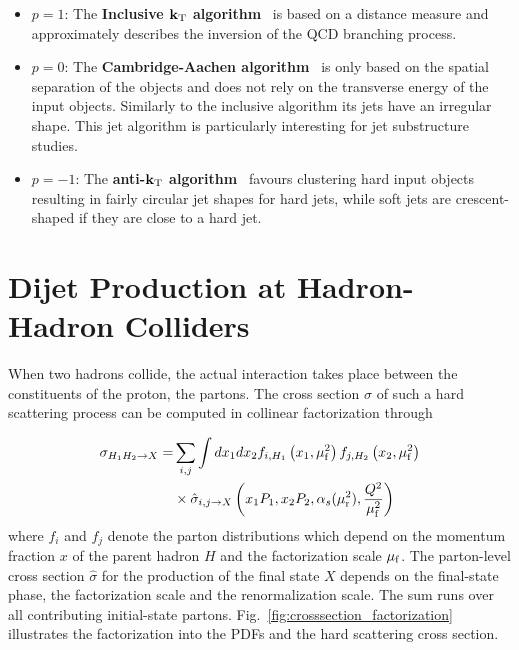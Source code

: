 \begin{itemize}
    \item $p=1$: The \textbf{Inclusive $\mathbf{k_{\mathrm{T}}}$
    algorithm}~\cite{Catani:1991hj,Catani:1992rm} is based on a \ptsq
        distance measure and approximately describes the inversion
        of the QCD branching process.
    \item $p=0$: The \textbf{Cambridge-Aachen
        algorithm}~\cite{Dokshitzer:1997in} is only based on the spatial
        separation of the objects and does not rely on the transverse energy of
        the input objects. Similarly to the inclusive \kt algorithm its jets
        have an irregular shape. This jet algorithm is particularly interesting
        for jet substructure studies.
    \item  $p=-1$: The \textbf{anti-$\mathbf{k_{\mathrm{T}}}$
    algorithm}~\cite{Cacciari:2008gp} favours clustering hard input objects
    resulting in fairly circular jet shapes for hard jets, while soft jets are
    crescent-shaped if they are close to a hard jet.
\end{itemize}

\section{Dijet Production at Hadron-Hadron Colliders}

When two hadrons collide, the actual interaction takes place between the
constituents of the proton, the partons. The cross section $\sigma$ of such a hard
scattering process can be computed in collinear factorization through

\begin{equation*}
    \begin{split}
    \sigma_{H_1 H_2 \rightarrow X} = &\sum_{i,j} \int dx_1 dx_2 f_{i, H_1}
    \left(x_1, \mu_{\mathrm{f}}^2 \right) f_{j,H_2} \left(x_2, \mu_{\mathrm{f}}^2 \right) \\ 
    &\times \hat\sigma_{i,j \rightarrow X} \left( x_1 P_1, x_2P_2, \alpha_{s}(\mu_{\mathrm{r}}^2),
    \frac{Q^2}{\mu_{\mathrm{f}}^2} \right)
\end{split}
\end{equation*}
%
where $f_i$ and $f_j$ denote the parton distributions which depend on the
momentum fraction $x$ of the parent hadron $H$ and the factorization scale
$\mu_{\mathrm{f}}$. The parton-level cross section $\hat \sigma$ for the production of the
final state $X$ depends on the final-state phase, the factorization scale and
the renormalization scale. The sum runs over all contributing initial-state
partons. Fig.~\ref{fig:crosssection_factorization} illustrates the factorization
into the PDFs and the hard scattering cross section.

